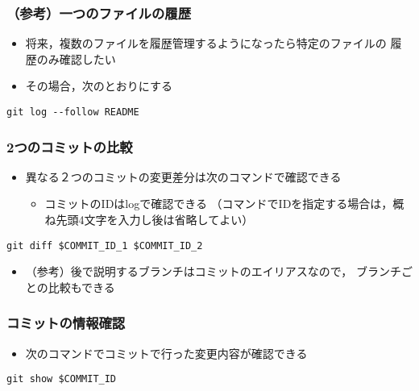 \documentclass[a4paper,twoside,twocolumn]{bxjsarticle}
\begin{document}
\subsubsection{（参考）一つのファイルの履歴}
\label{sec-1-5-2}
\begin{itemize}
\item 将来，複数のファイルを履歴管理するようになったら特定のファイルの
履歴のみ確認したい
\item その場合，次のとおりにする
\end{itemize}

\begin{verbatim}
git log --follow README
\end{verbatim}

\subsubsection{2つのコミットの比較}
\label{sec-1-5-3}
\begin{itemize}
\item 異なる２つのコミットの変更差分は次のコマンドで確認できる
\begin{itemize}
\item コミットのIDはlogで確認できる
（コマンドでIDを指定する場合は，概ね先頭4文字を入力し後は省略してよい）
\end{itemize}
\end{itemize}

\begin{verbatim}
git diff $COMMIT_ID_1 $COMMIT_ID_2
\end{verbatim}

\begin{itemize}
\item （参考）後で説明するブランチはコミットのエイリアスなので，
ブランチごとの比較もできる
\end{itemize}

\subsubsection{コミットの情報確認}
\label{sec-1-5-4}
\begin{itemize}
\item 次のコマンドでコミットで行った変更内容が確認できる
\end{itemize}

\begin{verbatim}
git show $COMMIT_ID
\end{verbatim}
\end{document}
